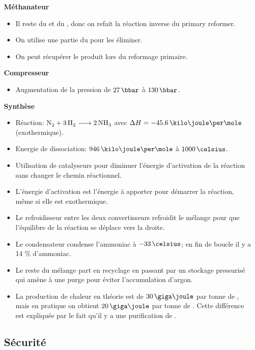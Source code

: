 \textbf{Méthanateur}
\begin{itemize}
\item Il reste du  et du , donc on refait la réaction inverse du primary reformer.
\item On utilise une partie du  pour les éliminer.
\item On peut récupérer le  produit lors du reformage primaire.
\end{itemize}


\textbf{Compresseur}
\begin{itemize}
\item Augmentation de la pression de $27\,\bbar$ à $130\,\bbar$.
\end{itemize}

\textbf{Synthèse }
\begin{itemize}
\item Réaction: $\ce{N2 + 3H2  -> 2NH3}$ avec $\Delta H = -45.6\,\kilo\joule\per\mole$ (exothermique).
\item Energie de dissociation: $946\,\kilo\joule\per\mole$ à $1000\,\celsius$.
\item Utilisation de catalyseurs pour diminuer l'énergie d'activation de la réaction sans changer le chemin réactionnel.
\item L'énergie d'activation est l'énergie à apporter pour démarrer la réaction, même si elle est exothermique.
\item Le refroidisseur entre les deux convertisseurs refroidit le mélange pour que l'équilibre de la réaction se déplace vers la droite.
\item Le condensateur condense l'ammoniac à $-33\,\celsius$; en fin de boucle il y a
14 \% d'ammoniac.
\item Le reste du mélange part en recyclage en passant par un stockage pressurisé qui amène à une purge pour éviter l'accumulation d'argon.
\item La production de chaleur en théorie est de $30\,\giga\joule$ par tonne de , mais en pratique on obtient $20\,\giga\joule$ par tonne de .
Cette différence est expliquée par le fait qu'il y a une purification de .
\end{itemize}

\subsection{Sécurité}

